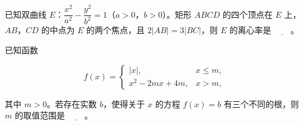 \begin{question}
已知双曲线 \(E\)：\(\dfrac{x^2}{a^2}-\dfrac{y^2}{b^2}=1\)（\(a>0\)，\(b>0\)）。矩形 \(ABCD\) 的四个顶点在 \(E\) 上，\(AB\)，\(CD\) 的中点为 \(E\) 的两个焦点，且 \(2|AB|=3|BC|\)，则 \(E\) 的离心率是 \(\underline{\qquad}\)。

\end{question}
\begin{question}
已知函数

\nopagebreak[4]
\[
f(x)=
\begin{cases}
|x|, & x\leqslant m,\\
x^2-2mx+4m, & x>m,
\end{cases}
\]

其中 \(m>0\)。若存在实数 \(b\)，使得关于 \(x\) 的方程 \(f(x)=b\) 有三个不同的根，则 \(m\) 的取值范围是 \(\underline{\qquad}\)。

\end{question}

